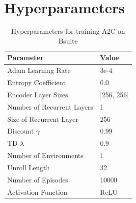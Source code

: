 \documentclass{article}
\begin{document}
\newpage
\section{Hyperparameters}
\label{app:hyperparameters}

\begin{table}[h]
\centering
\caption{Hyperparameters for training A2C on Bsuite}
\label{tab:bsuite-params}
\begin{tabular}{l|l}
Parameter & Value \\ \hline
Adam Learning Rate & 3e-4 \\
Entropy Coefficient & 0.0 \\
Encoder Layer Sizes & [256, 256] \\
Number of Recurrent Layers & 1 \\
Size of Recurrent Layer & 256 \\
Discount $\gamma$ & 0.99 \\
TD $\lambda$ & 0.9 \\
Number of Environments & 1 \\
Unroll Length & 32 \\
Number of Episodes & 10000 \\
Activation Function & ReLU \\
\end{tabular}
\end{table}

\end{document}
